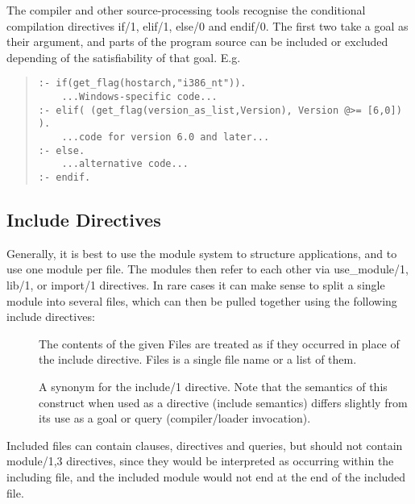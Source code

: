 The compiler and other source-processing tools recognise the conditional
compilation directives if/1, elif/1, else/0 and endif/0. The first two
take a goal as their argument, and parts of the program source can be
included or excluded depending of the satisfiability of that goal. E.g.
\begin{quote}\begin{verbatim}
:- if(get_flag(hostarch,"i386_nt")).
    ...Windows-specific code...
:- elif( (get_flag(version_as_list,Version), Version @>= [6,0]) ).
    ...code for version 6.0 and later...
:- else.
    ...alternative code...
:- endif.
\end{verbatim}
\end{quote}


\subsection{Include Directives}
\label{secinclude}

Generally, it is best to use the module system to structure {\eclipse}
applications, and to use one module per file.  The modules then refer
to each other via use_module/1, lib/1, or import/1 directives.
In rare cases it can make sense to split a single module into several
files, which can then be pulled together using the following include
directives:
\begin{description}
\item[]
The contents of the given Files are treated as if they occurred in place of
the include directive.  Files is a single file name or a list of them.

\item[]
A synonym for the include/1 directive.  Note that the semantics of this
construct when used as a directive (include semantics) differs slightly
from its use as a goal or query (compiler/loader invocation).
\end{description}
Included files can contain clauses, directives and queries, but should
not contain module/1,3 directives, since they would be interpreted as
occurring within the including file, and the included module would
not end at the end of the included file.


